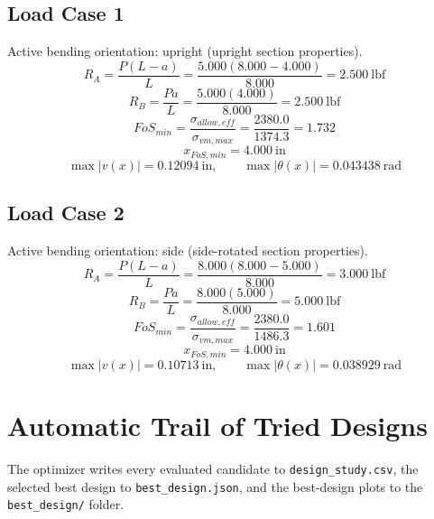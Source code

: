 \documentclass[11pt]{article}
\begin{document}
\subsection*{Load Case 1}
Active bending orientation: upright (upright section properties).
\[R_A = \frac{P(L-a)}{L} = \frac{5.000(8.000-4.000)}{8.000} = 2.500\ \mathrm{lbf}\]
\[R_B = \frac{Pa}{L} = \frac{5.000(4.000)}{8.000} = 2.500\ \mathrm{lbf}\]
\[FoS_{min} = \frac{\sigma_{allow,eff}}{\sigma_{vm,max}} = \frac{2380.0}{1374.3} = 1.732\]
\[x_{FoS,min} = 4.000\ \mathrm{in}\]
\[\max |v(x)| = 0.12094\ \mathrm{in}, \qquad \max |\theta(x)| = 0.043438\ \mathrm{rad}\]
\subsection*{Load Case 2}
Active bending orientation: side (side-rotated section properties).
\[R_A = \frac{P(L-a)}{L} = \frac{8.000(8.000-5.000)}{8.000} = 3.000\ \mathrm{lbf}\]
\[R_B = \frac{Pa}{L} = \frac{8.000(5.000)}{8.000} = 5.000\ \mathrm{lbf}\]
\[FoS_{min} = \frac{\sigma_{allow,eff}}{\sigma_{vm,max}} = \frac{2380.0}{1486.3} = 1.601\]
\[x_{FoS,min} = 4.000\ \mathrm{in}\]
\[\max |v(x)| = 0.10713\ \mathrm{in}, \qquad \max |\theta(x)| = 0.038929\ \mathrm{rad}\]

\section*{Automatic Trail of Tried Designs}
The optimizer writes every evaluated candidate to \texttt{design\_study.csv}, the selected best design to \texttt{best\_design.json}, and the best-design plots to the \texttt{best\_design/} folder.
\end{document}

